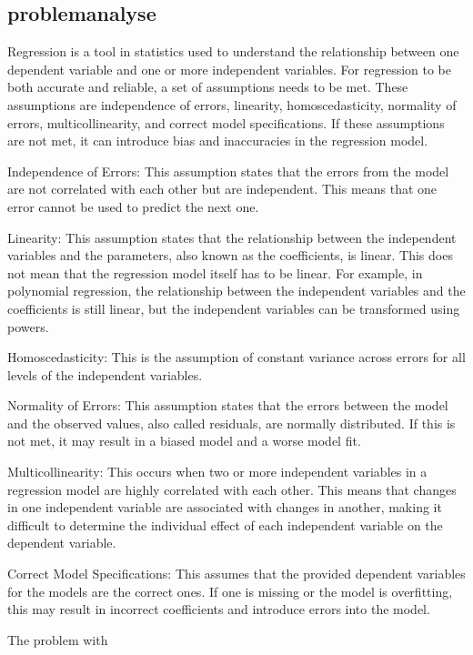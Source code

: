 \subsection{problemanalyse}

Regression is a tool in statistics used to understand the relationship between one dependent variable and one or more independent variables. For regression to be both accurate and reliable, a set of assumptions needs to be met. These assumptions are independence of errors, linearity, homoscedasticity, normality of errors, multicollinearity, and correct model specifications. If these assumptions are not met, it can introduce bias and inaccuracies in the regression model.

Independence of Errors: This assumption states that the errors from the model are not correlated with each other but are independent. This means that one error cannot be used to predict the next one.

Linearity: This assumption states that the relationship between the independent variables and the parameters, also known as the coefficients, is linear. This does not mean that the regression model itself has to be linear. For example, in polynomial regression, the relationship between the independent variables and the coefficients is still linear, but the independent variables can be transformed using powers.

Homoscedasticity: This is the assumption of constant variance across errors for all levels of the independent variables.

Normality of Errors: This assumption states that the errors between the model and the observed values, also called residuals, are normally distributed. If this is not met, it may result in a biased model and a worse model fit.

Multicollinearity: This occurs when two or more independent variables in a regression model are highly correlated with each other. This means that changes in one independent variable are associated with changes in another, making it difficult to determine the individual effect of each independent variable on the dependent variable.

Correct Model Specifications: This assumes that the provided dependent variables for the models are the correct ones. If one is missing or the model is overfitting, this may result in incorrect coefficients and introduce errors into the model.

The problem with
